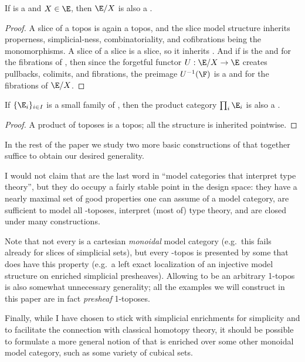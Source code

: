\begin{prop}\label{thm:slice-ttmt}
  If \E is a \ttmt and $X\in \E$, then $\E/X$ is also a \ttmt.
\end{prop}
\begin{proof}
  A slice of a topos is again a topos, and the slice model structure inherits properness, simplicial-ness, combinatoriality, and cofibrations being the monomorphisms.
  A slice of a slice is a slice, so it inherits \slcclosure.
  And if \F is the \local and \stratified \nfs for the fibrations of \E, then since the forgetful functor $U: \E/X\to \E$ creates pullbacks, colimits, and fibrations, the preimage \nfs $U^{-1}(\F)$ is a \local and \stratified \nfs for the fibrations of $\E/X$.
\end{proof}

\begin{prop}\label{thm:prod-ttmt}
  If $\{\E_i\}_{i\in I}$ is a small family of \ttmts, then the product category $\prod_i \E_i$ is also a \ttmt.
\end{prop}
\begin{proof}
  A product of toposes is a topos; all the structure is inherited pointwise.
\end{proof}

In the rest of the paper we study two more basic constructions of \ttmts that together suffice to obtain our desired generality.

\begin{rmk}\label{rmk:design-space}
  I would not claim that \ttmts are the last word in ``model categories that interpret type theory'', but they do occupy a fairly stable point in the design space: they have a nearly maximal set of good properties one can assume of a model category, are sufficient to model all \io-toposes, interpret (most of) type theory, and are closed under many constructions.

  Note that not every \ttmt is a cartesian \emph{monoidal} model category (e.g.\ this fails already for slices of simplicial sets), but every \io-topos is presented by some \ttmt that does have this property (e.g.\ a left exact localization of an injective model structure on enriched simplicial presheaves).
  Allowing \E to be an arbitrary 1-topos is also somewhat unnecessary generality; all the examples we will construct in this paper are in fact \emph{presheaf} 1-toposes.

  Finally, while I have chosen to stick with simplicial enrichments for simplicity and to facilitate the connection with classical homotopy theory, it should be possible to formulate a more general notion of \ttmt that is enriched over some other monoidal model category, such as some variety of cubical sets.
\end{rmk}

